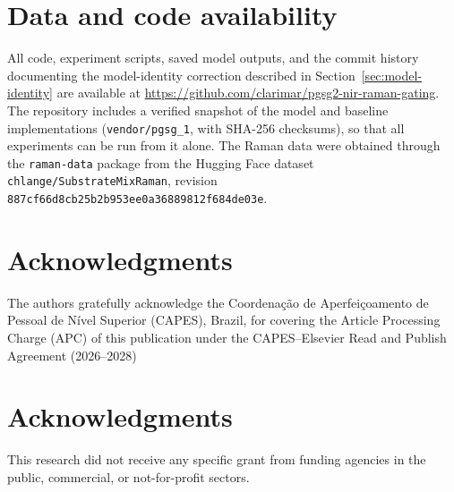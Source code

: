 \documentclass[preprint,12pt]{elsarticle}
\providecommand{\DIFaddtex}[1]{{\protect\color{blue} \sf #1}} %
\providecommand{\DIFdeltex}[1]{{\protect\color{red} \scriptsize #1}} %
\providecommand{\DIFaddbegin}{} %
\providecommand{\DIFaddend}{} %
\providecommand{\DIFdelbegin}{} %
\providecommand{\DIFdelend}{} %
\providecommand{\DIFadd}[1]{\texorpdfstring{\DIFaddtex{#1}}{#1}} %
\providecommand{\DIFdel}[1]{\texorpdfstring{\DIFdeltex{#1}}{}} %
\providecommand{\DIFscaledelfig}{0.5}
\newlength{\DIFdelgraphicswidth} %
\newlength{\DIFdelgraphicsheight} %
\providecommand{\DIFaddincludegraphics}[2][]{{\color{blue}\fbox{\DIFOincludegraphics[#1]{#2}}}} %
\providecommand{\DIFdelincludegraphics}[2][]{%
\sbox{\DIFdelgraphicsbox}{\DIFOincludegraphics[#1]{#2}}%
\settoboxwidth{\DIFdelgraphicswidth}{\DIFdelgraphicsbox} %
\settoboxtotalheight{\DIFdelgraphicsheight}{\DIFdelgraphicsbox} %
\scalebox{\DIFscaledelfig}{%
\parbox[b]{\DIFdelgraphicswidth}{\usebox{\DIFdelgraphicsbox}\\[-\baselineskip] \rule{\DIFdelgraphicswidth}{0em}}\llap{\resizebox{\DIFdelgraphicswidth}{\DIFdelgraphicsheight}{%
\setlength{\unitlength}{\DIFdelgraphicswidth}%
\begin{picture}(1,1)%
\thicklines\linethickness{2pt} %
{\color[rgb]{1,0,0}\put(0,0){\framebox(1,1){}}}%
{\color[rgb]{1,0,0}\put(0,0){\line( 1,1){1}}}%
{\color[rgb]{1,0,0}\put(0,1){\line(1,-1){1}}}%
\end{picture}%
}\hspace*{3pt}}} %
} %
\DeclareRobustCommand{\DIFaddbegin}{\DIFOaddbegin \let\includegraphics\DIFaddincludegraphics} %
\DeclareRobustCommand{\DIFaddend}{\DIFOaddend \let\includegraphics\DIFOincludegraphics} %
\DeclareRobustCommand{\DIFdelbegin}{\DIFOdelbegin \let\includegraphics\DIFdelincludegraphics} %
\DeclareRobustCommand{\DIFdelend}{\DIFOaddend \let\includegraphics\DIFOincludegraphics} %
\begin{document}
\section*{Data and code availability}
\label{sec:availability}
All code, experiment scripts, saved model outputs, and the commit history documenting the model-identity correction described in Section~\ref{sec:model-identity} are available at \url{https://github.com/clarimar/pgsg2-nir-raman-gating}. \DIFaddbegin \DIFadd{The repository includes a verified snapshot of the model and baseline implementations (\texttt{vendor/pgsg\_1}, with SHA-256 checksums), so that all experiments can be run from it alone. The Raman data were obtained through the \texttt{raman-data} package from the Hugging Face dataset \texttt{chlange/SubstrateMixRaman}, revision \texttt{887cf66d8cb25b2b953ee0a36889812f684de03e}.
}\DIFaddend 

\DIFdelbegin \section*{\DIFdel{Acknowledgments}}
\DIFdel{The authors gratefully acknowledge the Coordenação de Aperfeiçoamento de Pessoal de Nível Superior (CAPES), Brazil, for covering the Article Processing Charge (APC) of this publication under the CAPES--Elsevier Read and Publish Agreement (2026--2028)}\DIFdelend \DIFaddbegin \section*{\DIFadd{Acknowledgments}}
\DIFadd{This research did not receive any specific grant from funding agencies in the public, commercial, or not-for-profit sectors}\DIFaddend .




\end{document}

